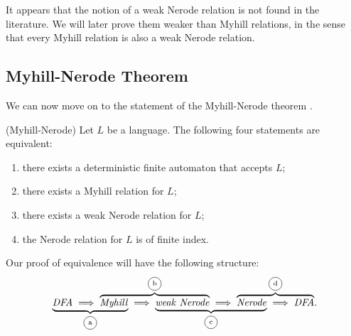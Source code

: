 

It appears that the notion of a weak Nerode relation is not found in the literature.
We will later prove them weaker than Myhill relations, in the sense that every Myhill relation is also a weak Nerode relation.

\subsection{Myhill-Nerode Theorem}
We can now move on to the statement of the Myhill-Nerode theorem \cite{DBLP:books/daglib/0088160}.



\begin{theorem}{(Myhill-Nerode)}
    \label{Myhill-Nerode}
    Let $L$ be a language. The following four statements are equivalent:
    \begin{enumerate}
        \item there exists a deterministic finite automaton that accepts $L$;
        \item there exists a Myhill relation for $L$;
        \item there exists a weak Nerode relation for $L$;
        \item the Nerode relation for $L$ is of finite index.
    \end{enumerate}
\end{theorem}

Our proof of equivalence will have the following structure:
\begin{equation*}
    \lefteqn{
        \underbrace{
            \phantom{
                \mathit{DFA} 
                \implies
                \mathit{Myhill} 
            }
        }_\text{\circled{a}}
    }
            \mathit{DFA} 
            \implies
    \lefteqn{
        \overbrace{
            \phantom{
                \mathit{Myhill}
                \implies
                \mathit{weak}_\textrm{} \; \mathit{Nerode} 
            }
        }^\text{\circled{b}}
    }
    \mathit{Myhill}
    \implies
    \lefteqn{
        \underbrace{
            \phantom{
                \mathit{weak}_\textrm{} \; \mathit{Nerode} 
                \implies
                \mathit{Nerode}
            }
        }_\text{\circled{c}} 
    }
    \mathit{weak}_\textrm{} \; \mathit{Nerode} 
    \implies
    \lefteqn{
        \overbrace{
            \phantom{
                \mathit{Nerode}
                \implies
                \mathit{DFA}
            }
        }^\text{\circled{d}} 
    }
    \mathit{Nerode}
    \implies
    \mathit{DFA}.
\end{equation*}


